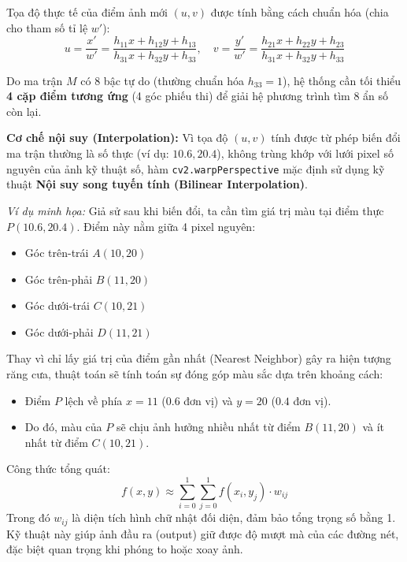 \documentclass[6pt, a4paper]{report}
\begin{document}
	Tọa độ thực tế của điểm ảnh mới $(u, v)$ được tính bằng cách chuẩn hóa (chia cho tham số tỉ lệ $w'$):
	\begin{equation}
		u = \frac{x'}{w'} = \frac{h_{11}x + h_{12}y + h_{13}}{h_{31}x + h_{32}y + h_{33}}, \quad 
		v = \frac{y'}{w'} = \frac{h_{21}x + h_{22}y + h_{23}}{h_{31}x + h_{32}y + h_{33}}
	\end{equation}
	
	Do ma trận $M$ có 8 bậc tự do (thường chuẩn hóa $h_{33}=1$), hệ thống cần tối thiểu \textbf{4 cặp điểm tương ứng} (4 góc phiếu thi) để giải hệ phương trình tìm 8 ẩn số còn lại.
	
	\textbf{Cơ chế nội suy (Interpolation):}
	Vì tọa độ $(u, v)$ tính được từ phép biến đổi ma trận thường là số thực (ví dụ: $10.6, 20.4$), không trùng khớp với lưới pixel số nguyên của ảnh kỹ thuật số, hàm \texttt{cv2.warpPerspective} mặc định sử dụng kỹ thuật \textbf{Nội suy song tuyến tính (Bilinear Interpolation)}.
	
	
	
	\textit{Ví dụ minh họa:}
	Giả sử sau khi biến đổi, ta cần tìm giá trị màu tại điểm thực $P(10.6, 20.4)$. Điểm này nằm giữa 4 pixel nguyên:
	\begin{itemize}
		\item Góc trên-trái $A(10, 20)$
		\item Góc trên-phải $B(11, 20)$
		\item Góc dưới-trái $C(10, 21)$
		\item Góc dưới-phải $D(11, 21)$
	\end{itemize}
	
	Thay vì chỉ lấy giá trị của điểm gần nhất (Nearest Neighbor) gây ra hiện tượng răng cưa, thuật toán sẽ tính toán sự đóng góp màu sắc dựa trên khoảng cách:
	\begin{itemize}
		\item Điểm $P$ lệch về phía $x=11$ ($0.6$ đơn vị) và $y=20$ ($0.4$ đơn vị).
		\item Do đó, màu của $P$ sẽ chịu ảnh hưởng nhiều nhất từ điểm $B(11, 20)$ và ít nhất từ điểm $C(10, 21)$.
	\end{itemize}
	
	Công thức tổng quát:
	\begin{equation}
		f(x, y) \approx \sum_{i=0}^{1} \sum_{j=0}^{1} f(x_i, y_j) \cdot w_{ij}
	\end{equation}
	Trong đó $w_{ij}$ là diện tích hình chữ nhật đối diện, đảm bảo tổng trọng số bằng 1. Kỹ thuật này giúp ảnh đầu ra (output) giữ được độ mượt mà của các đường nét, đặc biệt quan trọng khi phóng to hoặc xoay ảnh.
	
\end{document}
